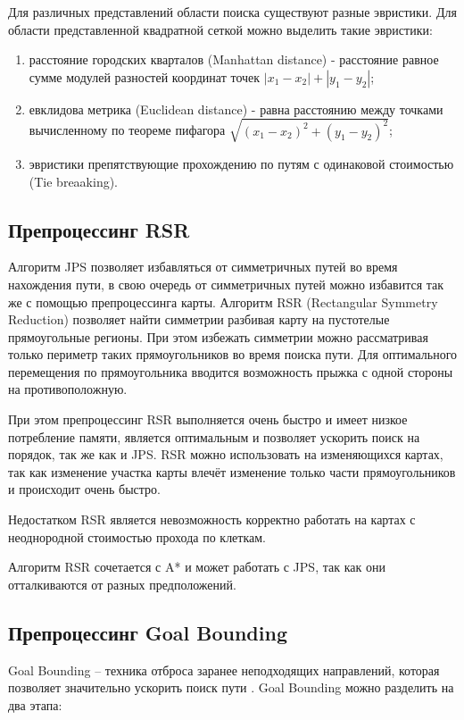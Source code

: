 Для различных представлений области поиска существуют разные эвристики. Для области представленной квадратной сеткой можно выделить такие эвристики:

\begin{enumerate}
	\item расстояние городских кварталов (Manhattan distance) - расстояние равное сумме модулей разностей координат точек $|x_1 - x_2| + |y_1-y_2|$;
	\item евклидова метрика (Euclidean distance) - равна расстоянию между точками вычисленному по теореме пифагора $\sqrt{(x_1 - x_2)^2 + (y_1 - y_2)^2}$;
	\item эвристики препятствующие прохождению по путям с одинаковой стоимостью (Tie breaaking).
\end{enumerate} 

\subsection{Препроцессинг RSR}

Алгоритм JPS позволяет избавляться от симметричных путей во время нахождения пути, в свою очередь от симметричных путей можно избавится так же с помощью препроцессинга карты. Алгоритм RSR (Rectangular Symmetry Reduction) позволяет найти симметрии разбивая карту на пустотелые прямоугольные регионы. При этом избежать симметрии можно рассматривая только периметр таких прямоугольников во время поиска пути. Для оптимального перемещения по прямоугольника вводится возможность прыжка с одной стороны на противоположную.

При этом препроцессинг RSR выполняется очень быстро и имеет низкое потребление памяти, является оптимальным и позволяет ускорить поиск на порядок, так же как и JPS. RSR можно использовать на изменяющихся картах, так как изменение участка карты влечёт изменение только части прямоугольников и происходит очень быстро.

Недостатком RSR является невозможность корректно работать на картах с неоднородной стоимостью прохода по клеткам.  

Алгоритм RSR сочетается с A* и может работать с JPS, так как они отталкиваются от разных предположений.

\subsection{Препроцессинг Goal Bounding}

Goal Bounding -- техника отброса заранее неподходящих направлений, которая позволяет значительно ускорить поиск пути \cite{GOAL_BOUNDING}. Goal Bounding можно разделить на два этапа:

